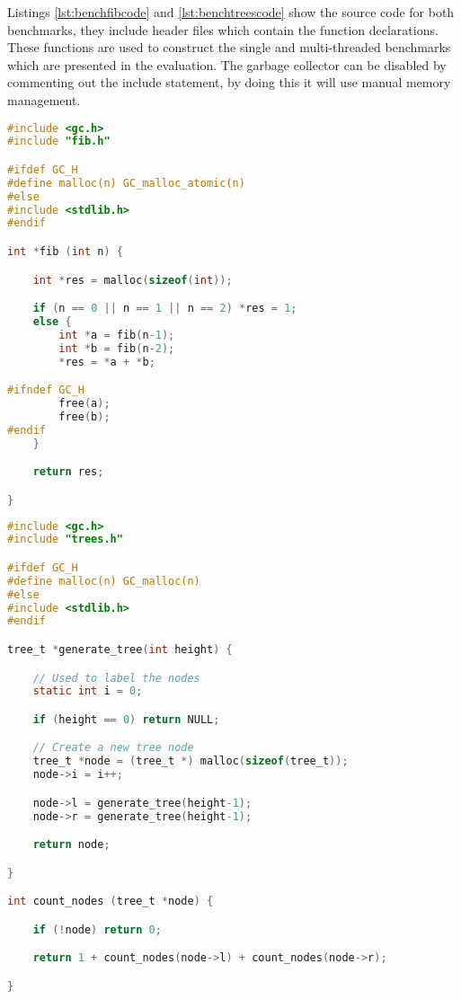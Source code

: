 \documentclass[12pt,a4paper,twoside,openright]{report}
\begin{document}
Listings \ref{lst:benchfibcode} and \ref{lst:benchtreescode} show the source code for both benchmarks, they include header files which contain the function declarations. These functions are used to construct the single and multi-threaded benchmarks which are presented in the evaluation. The garbage collector can be disabled by commenting out the include statement, by doing this it will use manual memory management.

\begin{figure*}
\begin{lstlisting}[language=C, caption=Fibonacci benchmark source code, label={lst:benchfibcode}]
#include <gc.h>
#include "fib.h"

#ifdef GC_H
#define malloc(n) GC_malloc_atomic(n)
#else
#include <stdlib.h>
#endif

int *fib (int n) {

    int *res = malloc(sizeof(int));

    if (n == 0 || n == 1 || n == 2) *res = 1;
    else {
        int *a = fib(n-1);
        int *b = fib(n-2);
        *res = *a + *b;

#ifndef GC_H
        free(a);
        free(b);
#endif
    }

    return res;

}
\end{lstlisting}
\end{figure*}

\begin{figure*}
\begin{lstlisting}[language=C, caption=Trees benchmark source code, label={lst:benchtreescode}]
#include <gc.h>
#include "trees.h"

#ifdef GC_H
#define malloc(n) GC_malloc(n)
#else
#include <stdlib.h>
#endif

tree_t *generate_tree(int height) {

    // Used to label the nodes
    static int i = 0;

    if (height == 0) return NULL;

    // Create a new tree node
    tree_t *node = (tree_t *) malloc(sizeof(tree_t));
    node->i = i++;

    node->l = generate_tree(height-1);
    node->r = generate_tree(height-1);

    return node;

}

int count_nodes (tree_t *node) {

    if (!node) return 0;

    return 1 + count_nodes(node->l) + count_nodes(node->r);

}
\end{lstlisting}
\end{figure*}
\end{document}
